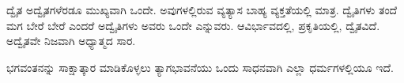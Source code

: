 \vskip 5pt

ದ್ವೈತ ಅದ್ವೈತಗಳೆರಡೂ ಮುಖ್ಯವಾಗಿ ಒಂದೇ. ಅವುಗಳಲ್ಲಿರುವ ವ್ಯತ್ಯಾಸ ಬಾಹ್ಯ ವ್ಯಕ್ತತೆಯಲ್ಲಿ ಮಾತ್ರ. ದ್ವೈತಿಗಳು ತಂದೆ ಮಗ ಬೇರೆ ಬೇರೆ ಎಂದರೆ ಅದ್ವೈತಿಗಳು ಅವರು ಒಂದೇ ಎನ್ನುವರು. ಆವಿರ್ಭಾವದಲ್ಲಿ, ಪ್ರಕೃತಿಯಲ್ಲಿ, ದ್ವೈತವಿದೆ. ಅದ್ವೈತವೇ ನಿಜವಾಗಿ ಅಧ್ಯಾತ್ಮದ ಸಾರ.

\vskip 5pt

ಭಗವಂತನನ್ನು ಸಾಕ್ಷಾತ್ಕಾರ ಮಾಡಿಕೊಳ್ಳಲು ತ್ಯಾಗಭಾವನೆಯು ಒಂದು ಸಾಧನವಾಗಿ ಎಲ್ಲಾ ಧರ್ಮಗಳಲ್ಲಿಯೂ ಇದೆ.

